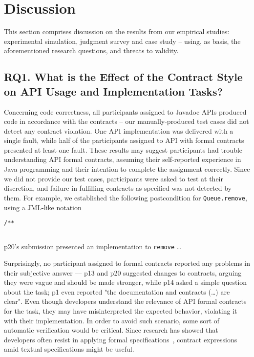 \section{Discussion}
\label{sec:discussion}

This section comprises discussion on the results from our empirical studies: experimental simulation, judgment survey and case study -- using, as basis, the aforementioned research questions, and threats to validity.


\subsection{RQ1. What is the Effect of the Contract Style on API Usage and Implementation Tasks?}
\label{rq1}

Concerning code correctness, all participants assigned to Javadoc APIs produced code
in accordance with the contracts -- our manually-produced test cases did not detect any contract violation. One \contractjdoc{} API implementation was delivered with a single fault, while half of the participants assigned to API with formal contracts presented at least one fault.
These results may suggest participants had trouble understanding API formal contracts, assuming their self-reported experience in Java programming and their intention to complete the assignment correctly.
Since we did not provide our test cases, participants were asked to test at their discretion, and failure in fulfilling contracts as specified was not detected by them.
For example, we established the following postcondition for \texttt{Queue.remove}, using a JML-like notation
\begin{lstlisting}[basicstyle=\footnotesize\ttfamily,name=figxpi, frame=lines, mathescape=true]
/**
   
\end{lstlisting}
p20's submission presented an implementation to \texttt{remove} \ldots 

Surprisingly, no participant assigned to formal contracts reported any problems in their subjective answer –– p13 and p20 suggested changes to contracts, arguing they were vague and should be made stronger, while p14 asked a simple question about the task; p1 even reported "the documentation and contracts (\ldots) are clear".
Even though developers understand the relevance of API formal contracts for the task, they may have misinterpreted the expected behavior, violating it with their implementation.
In order to avoid such scenario, some sort of automatic verification would be critical.
Since research has showed that developers often resist in applying formal specifications~\cite{}, contract expressions amid textual specifications might be useful.

